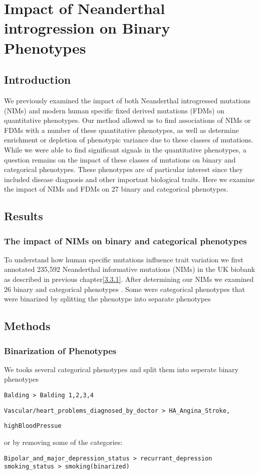 \chapter{Impact of Neanderthal introgression on Binary Phenotypes}
\section{Introduction}
We previously examined the impact of both Neanderthal introgressed mutations (NIMs) and modern human specific fixed derived mutations (FDMs) on quantitative phenotypes. Our method allowed us to find associations of NIMs or FDMs with a number of these quantitative phenotypes, as well as determine enrichment or depletion of phenotypic variance due to these classes of mutations. While we were able to find significant signals in the quantitative phenotypes, a question remains on the impact of these classes of mutations on binary and categorical phenotypes. These phenotypes are of particular interest since they included disease diagnosis and other important biological traits. Here we examine the impact of NIMs and FDMs on 27 binary and categorical phenotypes.

\section{Results}
\subsection{The impact of NIMs on binary and categorical phenotypes}

To understand how human specific mutations influence trait variation we first annotated 235,592 Neanderthal informative mutations (NIMs) in the UK biobank as described in previous chapter\ref{3.3.1}.  
After determining our NIMs we examined 26 binary and categorical phenotypes . Some were categorical phenotypes that were binarized by splitting the phenotype into separate phenotypes 

\section{Methods}
\subsection{Binarization of Phenotypes}
We tooks several categorical phenotypes and split them into seperate binary phenotypes
\begin{verbatim}
Balding > Balding 1,2,3,4
\end{verbatim}
\begin{verbatim}
Vascular/heart_problems_diagnosed_by_doctor > HA_Angina_Stroke,
\end{verbatim}
\begin{verbatim}
highBloodPressue
\end{verbatim}
or by removing some of the categories:
\begin{verbatim}
Bipolar_and_major_depression_status > recurrant_depression
smoking_status > smoking(binarized)\end{verbatim}

